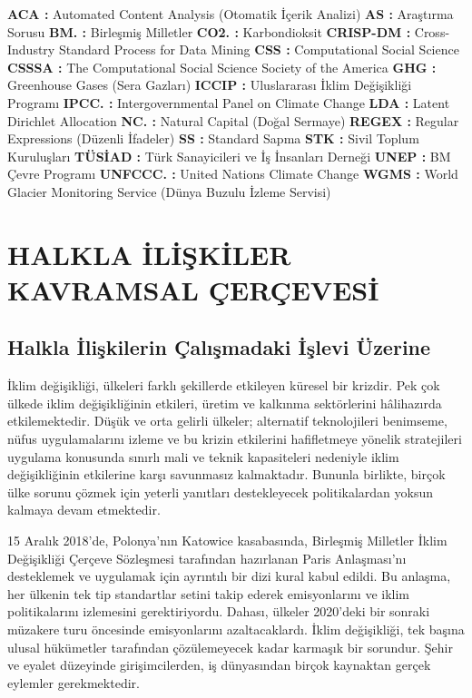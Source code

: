 \documentclass[
]{book}
\begin{document}
\textbf{ACA :} Automated Content Analysis (Otomatik İçerik Analizi)
\textbf{AS :} Araştırma Sorusu
\textbf{BM. :} Birleşmiş Milletler
\textbf{CO2. :} Karbondioksit
\textbf{CRISP-DM :} Cross-Industry Standard Process for Data Mining
\textbf{CSS :} Computational Social Science
\textbf{CSSSA :} The Computational Social Science Society of the America
\textbf{GHG :} Greenhouse Gases (Sera Gazları)
\textbf{ICCIP :} Uluslararası İklim Değişikliği Programı
\textbf{IPCC. :} Intergovernmental Panel on Climate Change
\textbf{LDA :} Latent Dirichlet Allocation
\textbf{NC. :} Natural Capital (Doğal Sermaye)
\textbf{REGEX :} Regular Expressions (Düzenli İfadeler)
\textbf{SS :} Standard Sapma
\textbf{STK :} Sivil Toplum Kuruluşları
\textbf{TÜSİAD :} Türk Sanayicileri ve İş İnsanları Derneği
\textbf{UNEP :} BM Çevre Programı
\textbf{UNFCCC. :} United Nations Climate Change
\textbf{WGMS :} World Glacier Monitoring Service (Dünya Buzulu İzleme Servisi)

\hypertarget{intro}{%
\chapter{HALKLA İLİŞKİLER KAVRAMSAL ÇERÇEVESİ}\label{intro}}

\hypertarget{halkla-iliux15fkilerin-uxe7alux131ux15fmadaki-iux15flevi-uxfczerine}{%
\section{Halkla İlişkilerin Çalışmadaki İşlevi Üzerine}\label{halkla-iliux15fkilerin-uxe7alux131ux15fmadaki-iux15flevi-uxfczerine}}

İklim değişikliği, ülkeleri farklı şekillerde etkileyen küresel bir krizdir. Pek çok ülkede iklim değişikliğinin etkileri, üretim ve kalkınma sektörlerini hâlihazırda etkilemektedir. Düşük ve orta gelirli ülkeler; alternatif teknolojileri benimseme, nüfus uygulamalarını izleme ve bu krizin etkilerini hafifletmeye yönelik stratejileri uygulama konusunda sınırlı mali ve teknik kapasiteleri nedeniyle iklim değişikliğinin etkilerine karşı savunmasız kalmaktadır. Bununla birlikte, birçok ülke sorunu çözmek için yeterli yanıtları destekleyecek politikalardan yoksun kalmaya devam etmektedir. \citep{glasgow2018public}

15 Aralık 2018'de, Polonya'nın Katowice kasabasında, Birleşmiş Milletler İklim Değişikliği Çerçeve Sözleşmesi tarafından hazırlanan Paris Anlaşması'nı desteklemek ve uygulamak için ayrıntılı bir dizi kural kabul edildi. Bu anlaşma, her ülkenin tek tip standartlar setini takip ederek emisyonlarını ve iklim politikalarını izlemesini gerektiriyordu. Dahası, ülkeler 2020'deki bir sonraki müzakere turu öncesinde emisyonlarını azaltacaklardı. İklim değişikliği, tek başına ulusal hükümetler tarafından çözülemeyecek kadar karmaşık bir sorundur. Şehir ve eyalet düzeyinde girişimcilerden, iş dünyasından birçok kaynaktan gerçek eylemler gerekmektedir. \citep{dhanda2019climate}
\end{document}
